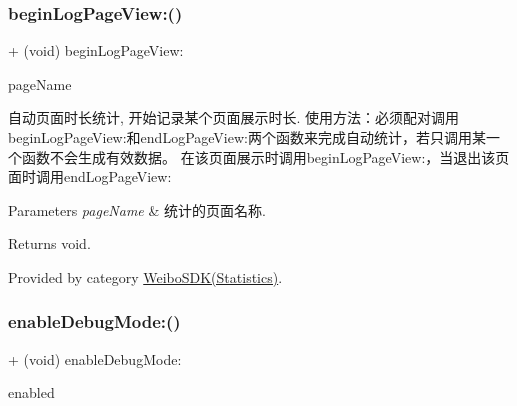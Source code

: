 \mbox{\label{interface_weibo_s_d_k_ae9b18093f71e740c51f254fb517e818d}} 
\subsubsection{\texorpdfstring{begin\+Log\+Page\+View\+:()}{beginLogPageView:()}\hspace{0.1cm}{\footnotesize\ttfamily [3/3]}}
{\footnotesize\ttfamily + (void) begin\+Log\+Page\+View\+: \begin{DoxyParamCaption}\item[{(N\+S\+String $\ast$)}]{page\+Name }\end{DoxyParamCaption}}

自动页面时长统计, 开始记录某个页面展示时长. 使用方法：必须配对调用begin\+Log\+Page\+View\+:和end\+Log\+Page\+View\+:两个函数来完成自动统计，若只调用某一个函数不会生成有效数据。 在该页面展示时调用begin\+Log\+Page\+View\+:，当退出该页面时调用end\+Log\+Page\+View\+: 
\begin{DoxyParams}{Parameters}
{\em page\+Name} & 统计的页面名称. \\
\hline
\end{DoxyParams}
\begin{DoxyReturn}{Returns}
void. 
\end{DoxyReturn}


Provided by category \mbox{\hyperlink{category_weibo_s_d_k_07_statistics_08_ae9b18093f71e740c51f254fb517e818d}{Weibo\+S\+D\+K(\+Statistics)}}.

\mbox{\label{interface_weibo_s_d_k_a34fc58188a69b4585b4f49cda4f3cc17}} 
\subsubsection{\texorpdfstring{enable\+Debug\+Mode\+:()}{enableDebugMode:()}\hspace{0.1cm}{\footnotesize\ttfamily [1/3]}}
{\footnotesize\ttfamily + (void) enable\+Debug\+Mode\+: \begin{DoxyParamCaption}\item[{(B\+O\+OL)}]{enabled }\end{DoxyParamCaption}}

